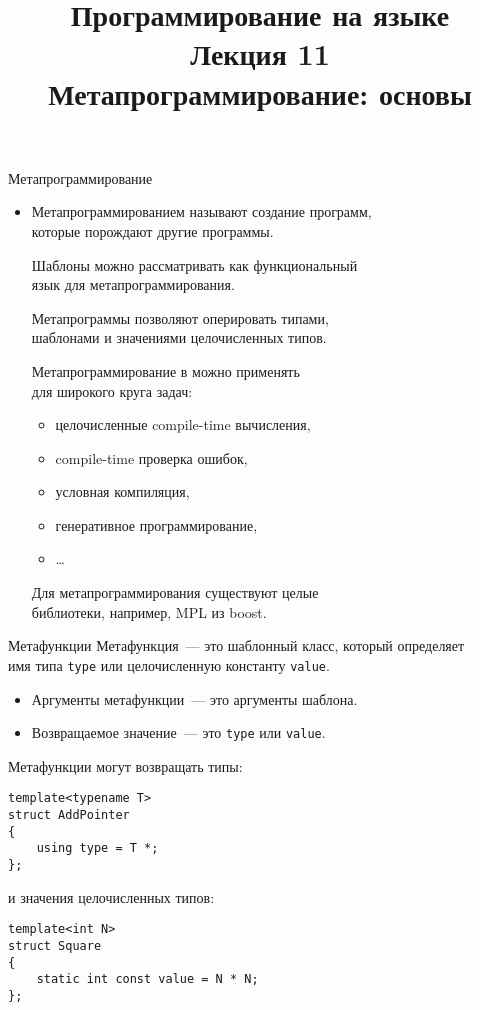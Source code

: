 \documentclass[aspectration=1610]{beamer}
\title{{\bf Программирование на языке \langcpp\protect\\Лекция
11\protect\vspace{1em}\\}Метапрограммирование: основы}
\begin{document}
\begin{frame} 
  \titlepage
\end{frame}

\begin{frame}[fragile]{Метапрограммирование}
\begin{itemize}
    \item Метапрограммированием называют создание программ, \\которые порождают другие программы.
    
    \pitem Шаблоны \langcpp можно рассматривать как функциональный\\ язык
    для метапрограммирования.
    
    \pitem Метапрограммы \langcpp позволяют оперировать типами, \\шаблонами и значениями целочисленных типов.
    
    \pitem Метапрограммирование в \langcpp можно применять\\ для широкого круга задач:
    \begin{itemize}
        \item целочисленные compile-time вычисления,
        \item compile-time проверка ошибок,
        \item условная компиляция,
        \item генеративное программирование,
        \item \ldots
    \end{itemize}
    
    \pitem Для метапрограммирования существуют целые\\ библиотеки,
    например, MPL из boost.
\end{itemize}
\end{frame}

\begin{frame}[fragile]{Метафункции}
Метафункция~--- это шаблонный класс, 
который определяет \\имя типа \texttt{type} или целочисленную константу \texttt{value}.
\begin{itemize}
\item Аргументы метафункции~--- это аргументы шаблона.
\item Возвращаемое значение~--- это \texttt{type} или \texttt{value}.
\end{itemize}

Метафункции могут возвращать типы:
\begin{lstlisting}
template<typename T> 
struct AddPointer
{
    using type = T *; 
};
\end{lstlisting}
и значения целочисленных типов:
\begin{lstlisting}
template<int N> 
struct Square
{
    static int const value = N * N; 
};
\end{lstlisting}
\end{frame}
\end{document}
